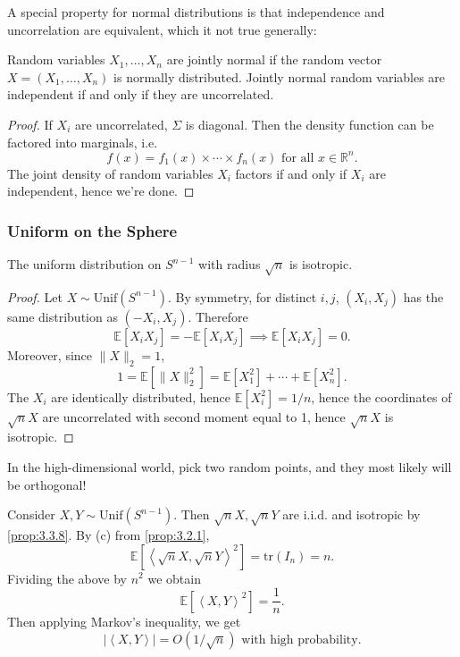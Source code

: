 A special property for normal distributions is that independence and uncorrelation are equivalent, which 
it not true generally: 
\begin{corollary}
\label{cor:3.3.7}
Random variables $X_1, \dots, X_n$ are jointly normal if the random vector $X = (X_1, \dots, X_n)$ is 
normally distributed. Jointly normal random variables are independent if and only if they are uncorrelated.
\end{corollary}

\begin{proof}
If $X_i$ are uncorrelated, $\Sigma$ is diagonal. Then the density function can be factored into marginals, 
i.e. 
\[ f(x) = f_1(x) \times \cdots \times f_n(x) \text{ for all } x \in \mathbb{R}^n. \]
The joint density of random variables $X_i$ factors if and only if $X_i$ are independent, hence we're done.
\end{proof}


\subsubsection{Uniform on the Sphere}
\begin{proposition}
\label{prop:3.3.8}
The uniform distribution on $S^{n - 1}$ with radius $\sqrt{n}$ is isotropic.
\end{proposition}

\begin{proof}
Let $X \sim \mathrm{Unif}(S^{n - 1})$. By symmetry, for distinct $i, j$, $(X_i, X_j)$ has the same distribution 
as $(-X_i, X_j)$. Therefore 
\[ \mathbb{E}[X_i X_j] = -\mathbb{E}[X_i X_j] \implies \mathbb{E}[X_i X_j] = 0. \]
Moreover, since $\lVert X \rVert_{2} = 1$, 
\[ 1 = \mathbb{E}[\lVert X \rVert_{2}^2] = \mathbb{E}[X_1^2] + \cdots + \mathbb{E}[X_n^2]. \]
The $X_i$ are identically distributed, hence $\mathbb{E}[X_i^2] = 1/n$, hence the coordinates of $\sqrt{n}X$ 
are uncorrelated with second moment equal to 1, hence $\sqrt{n}X$ is isotropic.
\end{proof}

\begin{note}
In the high-dimensional world, pick two random points, and they most likely will be orthogonal!

Consider $X, Y \sim \text{Unif}(S^{n - 1})$. Then $\sqrt{n}X, \sqrt{n}Y$ are i.i.d. and isotropic by 
\cref{prop:3.3.8}. By (c) from \cref{prop:3.2.1}, 
\[ \mathbb{E}[\left\langle \sqrt{n}X, \sqrt{n}Y \right\rangle^2] = \mathrm{tr}(I_n) = n. \]
Fividing the above by $n^2$ we obtain 
\[ \mathbb{E}[\left\langle X, Y \right\rangle^2] = \frac{1}{n}. \]
Then applying Markov's inequality, we get 
\[ |\left\langle X, Y \right\rangle| = O(1/ \sqrt{n}) \text{ with high probability}. \]
\end{note}

